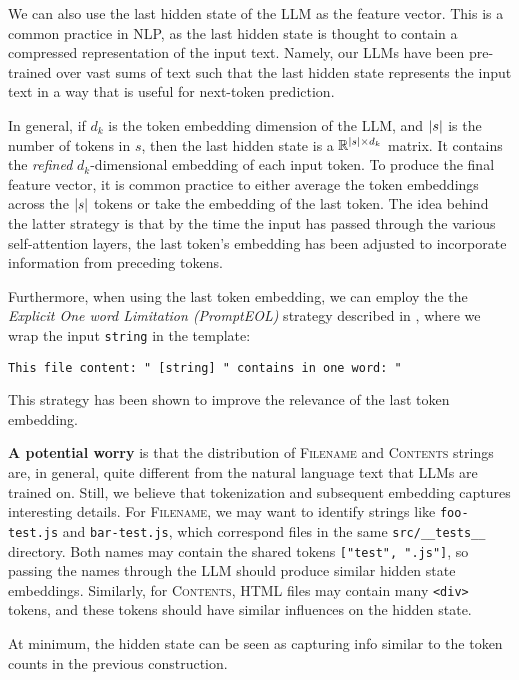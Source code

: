 \documentclass{article}
\begin{document}
We can also use the last hidden state of the LLM as the feature vector. This is a common practice in NLP, as the last hidden state is thought to contain a compressed representation of the input text. Namely, our LLMs have been pre-trained over vast sums of text such that the last hidden state represents the input text in a way that is useful for next-token prediction.

In general, if $d_k$ is the token embedding dimension of the LLM, and $\abs{s}$ is the number of tokens in $s$, then the last hidden state is a $\mathbb R^{\abs{s} \times d_k}$ matrix. It contains the \emph{refined} $d_k$-dimensional embedding of each input token. To produce the final feature vector, it is common practice to either average the token embeddings across the $\abs{s}$ tokens or take the embedding of the last token. The idea behind the latter strategy is that by the time the input has passed through the various self-attention layers, the last token's embedding has been adjusted to incorporate information from preceding tokens.

Furthermore, when using the last token embedding, we can employ the the \emph{Explicit One word Limitation (PromptEOL)} strategy described in \cite{jiang2023scalingsentenceembeddingslarge}, where we wrap the input \texttt{string} in the template:
\begin{center}
  \texttt{This file content: " [string] " contains in one word: "}
\end{center}
This strategy has been shown to improve the relevance of the last token embedding.

\textbf{A potential worry} is that the distribution of \textsc{Filename} and \textsc{Contents} strings are, in general, quite different from the natural language text that LLMs are trained on. Still, we believe that tokenization and subsequent embedding captures interesting details. For \textsc{Filename}, we may want to identify strings like \texttt{foo-test.js} and \texttt{bar-test.js}, which correspond files in the same \texttt{src/\_\_tests\_\_} directory. Both names may contain the shared tokens \texttt{["test", ".js"]}, so passing the names through the LLM should produce similar hidden state embeddings. Similarly, for \textsc{Contents}, HTML files may contain many \texttt{<div>} tokens, and these tokens should have similar influences on the hidden state.

At minimum, the hidden state can be seen as capturing info similar to the token counts in the previous construction.
\end{document}
